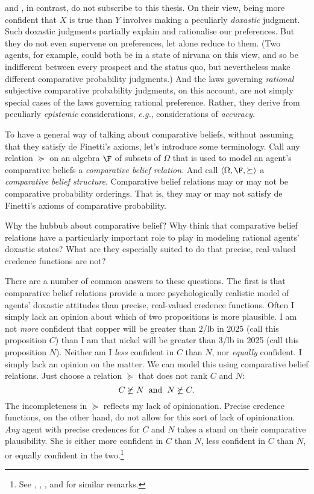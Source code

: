 \citet{Jeffrey1965, Jeffrey2002} and \citet{Joyce1999}, in contrast, do not subscribe to this thesis. On their view, being more confident that $X$ is true than $Y$ involves making a peculiarly \emph{doxastic} judgment. Such doxastic judgments partially explain and rationalise our preferences. But they do not even supervene on preferences, let alone reduce to them. (Two agents, for example, could both be in a state of nirvana on this view, and so be indifferent between every prospect and the status quo, but nevertheless make different comparative probability judgments.) And the laws governing \emph{rational} subjective comparative probability judgments, on this account, are not simply special cases of the laws governing rational preference. Rather, they derive from peculiarly \emph{epistemic} considerations, \textit{e.g.}, considerations of \emph{accuracy}.

To have a general way of talking about comparative beliefs, without assuming that they satisfy de Finetti's axioms, let's introduce some terminology. Call any relation $\succeq$ on an algebra $\F$ of subsets of $\Omega$ that is used to model an agent's comparative beliefs a \emph{comparative belief relation}. And call $\left<\Omega,\F,\succeq\right>$ a \emph{comparative belief structure}. Comparative belief relations may or may not be comparative probability orderings. That is, they may or may not satisfy de Finetti's axioms of comparative probability.

Why the hubbub about comparative belief? Why think that comparative belief relations have a particularly important role to play in modeling rational agents' doxastic states? What are they especially suited to do that precise, real-valued credence functions are not?


There are a number of common answers to these questions. The first is that comparative belief relations provide a more psychologically realistic model of agents' doxastic attitudes than precise, real-valued credence functions. Often I simply lack an opinion about which of two propositions is more plausible. I am not \textit{more} confident that copper will be greater than \textsterling$2$/lb in 2025 (call this proposition $C$) than I am that nickel will be greater than \textsterling$3$/lb in 2025 (call this proposition $N$). Neither am I \textit{less} confident in $C$ than $N$, nor \textit{equally} confident. I simply lack an opinion on the matter. We can model this using comparative belief relations. Just choose a relation $\succeq$ that does not rank $C$ and $N$:
$$ C\not\succeq N\hspace*{2mm}\textrm{and}\hspace*{2mm}N\not\succeq C. $$
The incompleteness in $\succeq$ reflects my lack of opinionation. Precise credence functions, on the other hand, do not allow for this sort of lack of opinionation. \textit{Any} agent with precise credences for $C$ and $N$ takes a stand on their comparative plausibility. She is either more confident in $C$ than $N$, less confident in $C$ than $N$, or equally confident in the two.\footnote{See \citet[p. 19]{Suppes1994}, \citet[p. 325]{Kyburg1996}, \citet[p. 47]{Kaplan2010}, and \citet[p. 283]{Joyce2010} for similar remarks.}




